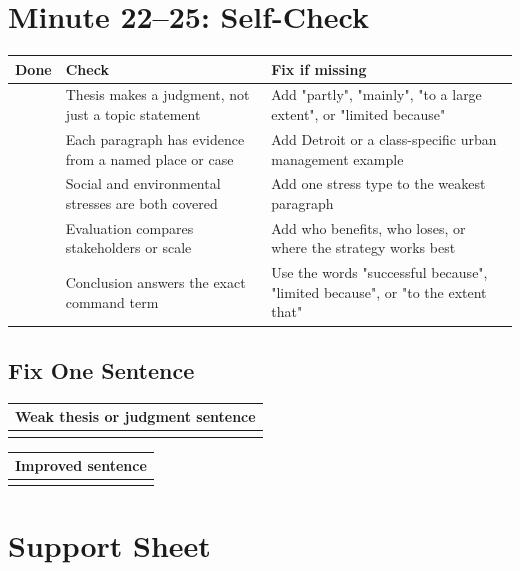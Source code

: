 \documentclass[11pt,a4paper]{article}
\newcommand{\todobox}{\fbox{\rule{0pt}{0.8em}\rule{0.8em}{0pt}}}
\begin{document}
\section{Minute 22--25: Self-Check}

\begin{tabularx}{\textwidth}{L{0.1\textwidth}Y Y}
\toprule
\textbf{Done} & \textbf{Check} & \textbf{Fix if missing} \\
\midrule
\todobox & Thesis makes a judgment, not just a topic statement & Add "partly",
"mainly", "to a large extent", or "limited because" \\
\todobox & Each paragraph has evidence from a named place or case & Add Detroit
or a class-specific urban management example \\
\todobox & Social and environmental stresses are both covered & Add one stress
type to the weakest paragraph \\
\todobox & Evaluation compares stakeholders or scale & Add who benefits, who
loses, or where the strategy works best \\
\todobox & Conclusion answers the exact command term & Use the words
"successful because", "limited because", or "to the extent that" \\
\bottomrule
\end{tabularx}

\subsection{Fix One Sentence}

\begin{tabularx}{\textwidth}{Y}
\toprule
\textbf{Weak thesis or judgment sentence} \\
\midrule
\rule{0pt}{1.3cm} \\
\bottomrule
\end{tabularx}

\vspace{0.65em}

\begin{tabularx}{\textwidth}{Y}
\toprule
\textbf{Improved sentence} \\
\midrule
\rule{0pt}{1.3cm} \\
\bottomrule
\end{tabularx}

\newpage

\section{Support Sheet}
\end{document}
